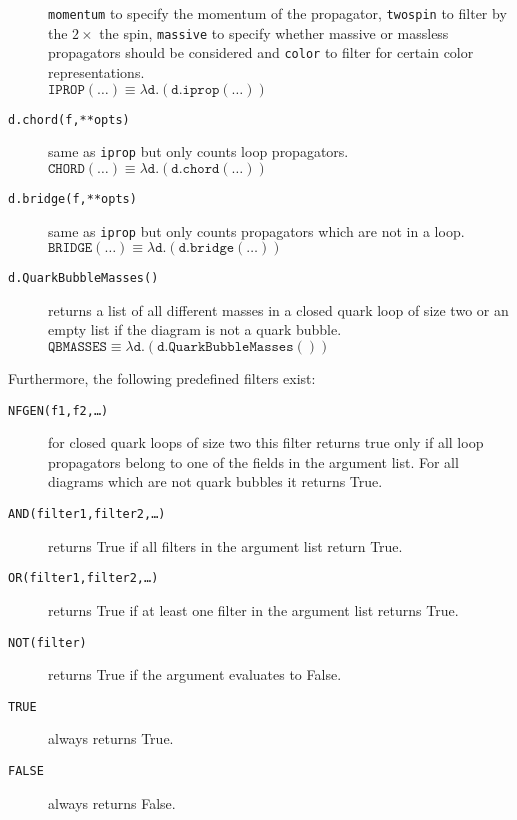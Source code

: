 \documentclass[11pt,a4paper]{refrep}
\begin{document}
\begin{description}
   \texttt{momentum} to specify the momentum of the propagator,
   \texttt{twospin} to filter by the $2\times$ the spin,
   \texttt{massive} to specify whether massive or massless propagators
   should be considered and \texttt{color} to filter for certain color
   representations.\\
   $\mathtt{IPROP(\ldots)}\equiv
    \lambda\mathtt{d}.(\mathtt{d.iprop(\ldots)})$
\item[\texttt{d.chord(f,**opts)}] same as \texttt{iprop}
   but only counts loop propagators.\\
   $\mathtt{CHORD(\ldots)}\equiv
    \lambda\mathtt{d}.(\mathtt{d.chord(\ldots)})$
\item[\texttt{d.bridge(f,**opts)}] same as \texttt{iprop}
   but only counts propagators which are not in a loop.\\
   $\mathtt{BRIDGE(\ldots)}\equiv
    \lambda\mathtt{d}.(\mathtt{d.bridge(\ldots)})$
\item[\texttt{d.QuarkBubbleMasses()}] returns a list of
   all different masses in a closed quark loop of size two
   or an empty list if the diagram is not a quark bubble.\\
   $\mathtt{QBMASSES}\equiv
    \lambda\mathtt{d}.(\mathtt{d.QuarkBubbleMasses()})$
\end{description}

Furthermore, the following predefined filters exist:
\begin{description}
\item[\texttt{NFGEN(f1,f2,\ldots)}] for closed quark loops of size two
   this filter returns true only if all loop propagators belong to one
   of the fields in the argument list. For all diagrams which are not
   quark bubbles it returns True.
\item[\texttt{AND(filter1,filter2,\ldots)}] returns True if all filters
   in the argument list return True.
\item[\texttt{OR(filter1,filter2,\ldots)}] returns True if at least one filter
   in the argument list returns True.
\item[\texttt{NOT(filter)}] returns True if the argument evaluates to False.
\item[\texttt{TRUE}] always returns True.
\item[\texttt{FALSE}] always returns False.
\end{description}


\end{document}
